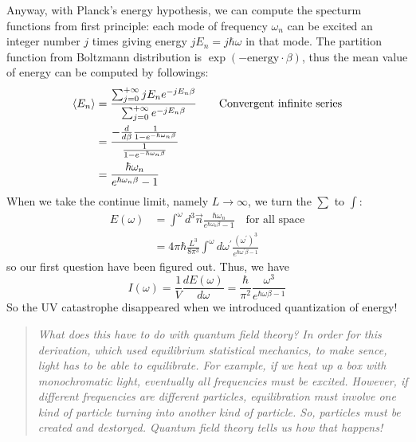 \documentclass[12pt,openany]{book}
\begin{document}
    Anyway, with Planck's energy hypothesis, we can compute the specturm functions from first principle: each mode
    of frequency $\omega_n$ can be excited an integer number $j$ times giving energy $jE_n=j\hbar\omega$ in that mode.
    The partition function from Boltzmann distribution is $\exp(-\text{energy}\cdot\beta)$, thus the mean value of
    energy can be computed by followings:
    \begin{equation}
    	\begin{aligned}
    		\braket{E_n}&=\frac{\sum_{j=0}^{+\infty}jE_ne^{-jE_n\beta}}{\sum_{j=0}^{+\infty}e^{-jE_n\beta}}\quad\quad\text{Convergent infinite series}\\
    		            &=\frac{-\frac{d}{d\beta}\frac{1}{1-e^{-\hbar\omega_n\beta}}}{\frac{1}{1-e^{-\hbar\omega_n\beta}}}\\
    		            &=\frac{\hbar\omega_n}{e^{\hbar\omega_n\beta}-1}
    	\end{aligned}
    \end{equation}
	When we take the continue limit, namely $L\rightarrow\infty$, we turn the $\sum$ to $\int$:
	\begin{equation}
	\begin{aligned}
			E(\omega)&=\int^{\omega}d^3\vec{n}\frac{\hbar\omega_n}{e^{\hbar\omega_n\beta}-1}\quad\text{for all space}\\
		             &=4\pi\hbar\frac{L^3}{8\pi^3}\int^{\omega}d\omega^\prime\frac{(\omega^\prime)^3}{e^{\hbar\omega^\prime\beta-1}}
	\end{aligned}
	\end{equation} 
	so our first question have been figured out. Thus, we have 
	\begin{equation}
		I(\omega)=\frac{1}{V}\frac{dE(\omega)}{d\omega}=\frac{\hbar}{\pi^2}\frac{\omega^3}{e^{\hbar\omega\beta-1}}
	\end{equation}
	So the UV catastrophe disappeared when we introduced quantization of energy!
	\par 
	\begin{quotation}
		\textit{
		What does this have to do with quantum field theory? In order for this derivation, which 
		used equilibrium statistical mechanics, to make sence, light has to be able to equilibrate. For
		example, if we heat up a box with monochromatic light, eventually all frequencies must be excited. However,
		 if different frequencies are different particles, equilibration must involve one kind of particle turning into another
		 kind of particle. So, particles must be created and destoryed. Quantum field theory tells us how that happens!
		}
	\end{quotation}
\end{document}
